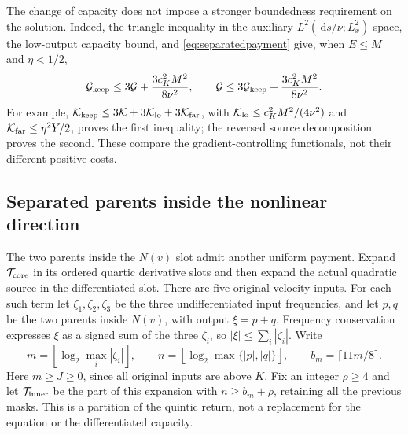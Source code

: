 \documentclass[11pt]{article}
\newcommand{\dd}{\,\mathrm d}
\begin{document}
The change of capacity does not impose a stronger boundedness requirement
on the solution. Indeed, the triangle inequality in the auxiliary
$L^2(\dd s/\nu;L^2_x)$ space, the low-output capacity bound, and
\eqref{eq:separatedpayment} give, when $E\leq M$ and $\eta<1/2$,
\[
 \mathcal G_{\rm keep}\leq3\mathcal G+\frac{3c_K^2M^2}{8\nu^2},
 \qquad
 \mathcal G\leq3\mathcal G_{\rm keep}+\frac{3c_K^2M^2}{8\nu^2}.
\]
For example,
$\mathcal K_{\rm keep}\leq3\mathcal K+3\mathcal K_{\rm lo}
 +3\mathcal K_{\rm far}$, with
$\mathcal K_{\rm lo}\leq c_K^2M^2/(4\nu^2)$ and
$\mathcal K_{\rm far}\leq\eta^2Y/2$, proves the first inequality;
the reversed source decomposition proves the second.
These compare the gradient-controlling functionals, not their
different positive costs.

\subsection{Separated parents inside the nonlinear direction}

The two parents inside the $N(v)$ slot admit another uniform payment.
Expand $\mathcal T_{\rm core}$ in its ordered quartic derivative slots
and then expand the actual quadratic source in the differentiated slot.
There are five original velocity inputs. For each such term let
$\zeta_1,\zeta_2,\zeta_3$ be the three undifferentiated input frequencies,
and let $p,q$ be the two parents inside $N(v)$, with output $\xi=p+q$.
Frequency conservation expresses $\xi$ as a signed sum of the three
$\zeta_i$, so $|\xi|\leq\sum_i|\zeta_i|$. Write
\[
 m=\left\lfloor\log_2\max_i|\zeta_i|\right\rfloor,\qquad
 n=\left\lfloor\log_2\max\{|p|,|q|\}\right\rfloor,\qquad
 b_m=\lceil11m/8\rceil.
\]
Here $m\geq J\geq0$, since all original inputs are above $K$.
Fix an integer $\rho\geq4$ and let $\mathcal T_{\rm inner}$ be the
part of this expansion with $n\geq b_m+\rho$, retaining all the
previous masks. This is a partition of the quintic return, not a
replacement for the equation or the differentiated capacity.
\end{document}
